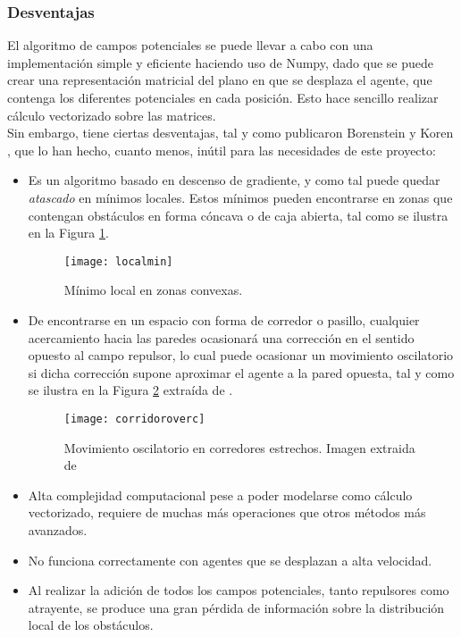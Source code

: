  \newpage
\subsubsection{Desventajas}
El algoritmo de campos potenciales se puede llevar a cabo con una implementación simple y eficiente haciendo uso de Numpy, dado que se puede crear una representación matricial del plano en que se desplaza el agente, que contenga los diferentes potenciales en cada posición. 
Esto hace sencillo realizar cálculo vectorizado sobre las matrices. \\Sin embargo, tiene ciertas desventajas, tal y como publicaron Borenstein y Koren \citep{art:BorensteinLims}, que lo han hecho, cuanto menos, inútil para las necesidades de este proyecto:
\begin{itemize}
\item Es un algoritmo basado en descenso de gradiente, y como tal puede quedar \textit{atascado} en mínimos locales. Estos mínimos pueden encontrarse en zonas que contengan obstáculos en forma cóncava o de caja abierta, tal como se ilustra en la Figura \ref{fig:localmin}.
\begin{figure}
	\centering
	\texttt{[image: localmin]}
	\caption{Mínimo local en zonas convexas.}\label{fig:localmin}
\end{figure}
\item \label{subsec:PFlims} De encontrarse en un espacio con forma de corredor o pasillo, cualquier acercamiento hacia las paredes ocasionará una corrección en el sentido opuesto al campo repulsor, lo cual puede ocasionar un movimiento oscilatorio si dicha corrección supone aproximar el agente a la pared opuesta, tal y como se ilustra en la Figura \ref{fig:corridoroverc} extraída de \citep{art:BorensteinLims}.
\begin{figure}
	\centering
	\texttt{[image: corridoroverc]}
	\caption[Movimiento oscilatorio en corredores estrechos.]{Movimiento oscilatorio en corredores estrechos. Imagen extraida de \citep{art:BorensteinKorenVFHHTML}}\label{fig:corridoroverc}
\end{figure}
\item Alta complejidad computacional pese a poder modelarse como cálculo vectorizado, requiere de muchas más operaciones que otros métodos más avanzados.
\item No funciona correctamente con agentes que se desplazan a alta velocidad. 
\item Al realizar la adición de todos los campos potenciales, tanto repulsores como atrayente, se produce una gran pérdida de información sobre la distribución local de los obstáculos.
\end{itemize} 

